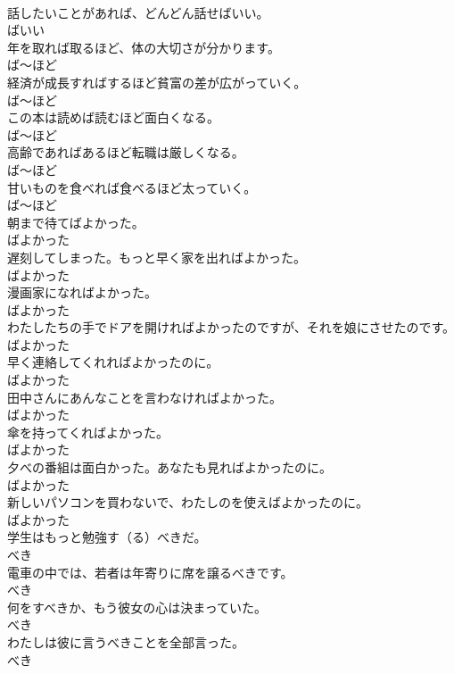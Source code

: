\documentclass[8pt]{extreport}
\begin{document}
\begin{CJK}{UTF8}{min}
\\	話したいことがあれば、どんどん話せばいい。	
\\	ばいい
\\	年を取れば取るほど、体の大切さが分かります。	
\\	ば～ほど
\\	経済が成長すればするほど貧富の差が広がっていく。	
\\	ば～ほど
\\	この本は読めば読むほど面白くなる。	
\\	ば～ほど
\\	高齢であればあるほど転職は厳しくなる。	
\\	ば～ほど
\\	甘いものを食べれば食べるほど太っていく。	
\\	ば～ほど
\\	朝まで待てばよかった。	
\\	ばよかった
\\	遅刻してしまった。もっと早く家を出ればよかった。	
\\	ばよかった
\\	漫画家になればよかった。	
\\	ばよかった
\\	わたしたちの手でドアを開ければよかったのですが、それを娘にさせたのです。	
\\	ばよかった
\\	早く連絡してくれればよかったのに。	
\\	ばよかった
\\	田中さんにあんなことを言わなければよかった。	
\\	ばよかった
\\	傘を持ってくればよかった。	
\\	ばよかった
\\	夕べの番組は面白かった。あなたも見ればよかったのに。	
\\	ばよかった
\\	新しいパソコンを買わないで、わたしのを使えばよかったのに。	
\\	ばよかった
\\	学生はもっと勉強す（る）べきだ。	
\\	べき
\\	電車の中では、若者は年寄りに席を譲るべきです。	
\\	べき
\\	何をすべきか、もう彼女の心は決まっていた。	
\\	べき
\\	わたしは彼に言うべきことを全部言った。	
\\	べき

\end{CJK}
\end{document}
